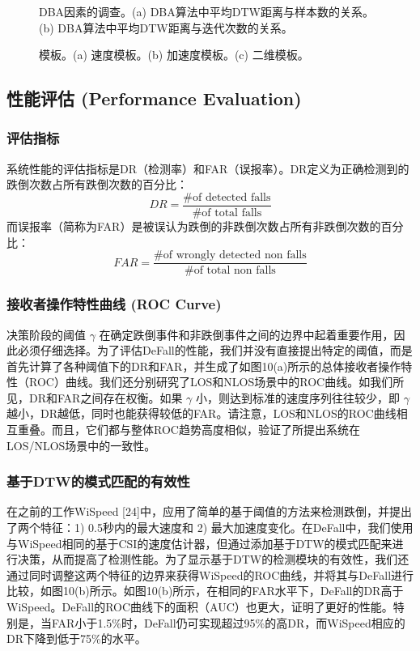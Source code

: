 \documentclass[journal]{IEEEtran}
\begin{document}
\begin{figure}[htbp]
\centering
\vspace{4cm} %
\caption{DBA因素的调查。(a) DBA算法中平均DTW距离与样本数的关系。(b) DBA算法中平均DTW距离与迭代次数的关系。}
\end{figure}

\begin{figure}[htbp]
\centering
\vspace{4cm} %
\caption{模板。(a) 速度模板。(b) 加速度模板。(c) 二维模板。}
\end{figure}

\subsection{性能评估 (Performance Evaluation)}
\subsubsection{评估指标}
系统性能的评估指标是DR（检测率）和FAR（误报率）。DR定义为正确检测到的跌倒次数占所有跌倒次数的百分比：
\begin{equation}
DR = \frac{\text{\# of detected falls}}{\text{\# of total falls}}
\end{equation}
而误报率（简称为FAR）是被误认为跌倒的非跌倒次数占所有非跌倒次数的百分比：
\begin{equation}
FAR = \frac{\text{\# of wrongly detected non falls}}{\text{\# of total non falls}}
\end{equation}

\subsubsection{接收者操作特性曲线 (ROC Curve)}
决策阶段的阈值 $\gamma$ 在确定跌倒事件和非跌倒事件之间的边界中起着重要作用，因此必须仔细选择。为了评估DeFall的性能，我们并没有直接提出特定的阈值，而是首先计算了各种阈值下的DR和FAR，并生成了如图10(a)所示的总体接收者操作特性（ROC）曲线。我们还分别研究了LOS和NLOS场景中的ROC曲线。如我们所见，DR和FAR之间存在权衡。如果 $\gamma$ 小，则达到标准的速度序列往往较少，即 $\gamma$ 越小，DR越低，同时也能获得较低的FAR。请注意，LOS和NLOS的ROC曲线相互重叠。而且，它们都与整体ROC趋势高度相似，验证了所提出系统在LOS/NLOS场景中的一致性。

\subsubsection{基于DTW的模式匹配的有效性}
在之前的工作WiSpeed [24]中，应用了简单的基于阈值的方法来检测跌倒，并提出了两个特征：1) 0.5秒内的最大速度和 2) 最大加速度变化。在DeFall中，我们使用与WiSpeed相同的基于CSI的速度估计器，但通过添加基于DTW的模式匹配来进行决策，从而提高了检测性能。为了显示基于DTW的检测模块的有效性，我们还通过同时调整这两个特征的边界来获得WiSpeed的ROC曲线，并将其与DeFall进行比较，如图10(b)所示。如图10(b)所示，在相同的FAR水平下，DeFall的DR高于WiSpeed。DeFall的ROC曲线下的面积（AUC）也更大，证明了更好的性能。特别是，当FAR小于1.5\%时，DeFall仍可实现超过95\%的高DR，而WiSpeed相应的DR下降到低于75\%的水平。
\end{document}
